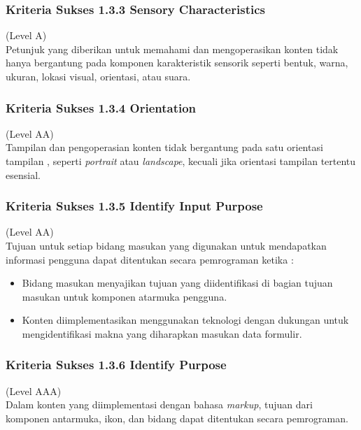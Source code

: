 \documentclass[a4paper,twoside]{article}
\begin{document}
\begin{enumerate}
		
		\subsubsection*{Kriteria Sukses 1.3.3 Sensory Characteristics}
		\label{subsubsec:kriteria_1.3.3}
		(Level A) \\
		
		Petunjuk yang diberikan untuk memahami dan mengoperasikan konten tidak hanya bergantung pada komponen karakteristik sensorik seperti bentuk, warna, ukuran, lokasi visual, orientasi, atau suara.
		
		
		\subsubsection*{Kriteria Sukses 1.3.4 Orientation}
		\label{subsubsec:kriteria_1.3.4}
		(Level AA) \\
		
		Tampilan dan pengoperasian konten tidak bergantung pada satu orientasi tampilan , seperti \textit{portrait} atau \textit{landscape}, kecuali jika orientasi tampilan tertentu esensial.
		
		
		\subsubsection*{Kriteria Sukses 1.3.5 Identify Input Purpose}
		\label{subsubsec:kriteria_1.3.5}
		(Level AA) \\
		Tujuan untuk setiap bidang masukan yang digunakan untuk mendapatkan informasi pengguna dapat ditentukan secara pemrograman ketika :
		
		\begin{itemize}
			\item Bidang masukan menyajikan tujuan yang diidentifikasi di bagian tujuan masukan untuk komponen atarmuka pengguna.
			\item Konten diimplementasikan menggunakan teknologi dengan dukungan untuk mengidentifikasi makna yang diharapkan masukan data formulir.
		\end{itemize}
		
		\subsubsection*{Kriteria Sukses 1.3.6 Identify Purpose}
		\label{subsubsec:kriteria_1.3.6}
		(Level AAA) \\
		
		Dalam konten yang diimplementasi dengan bahasa \textit{markup}, tujuan dari komponen antarmuka, ikon, dan bidang dapat ditentukan secara pemrograman.
		

\end{enumerate}
\end{document}
